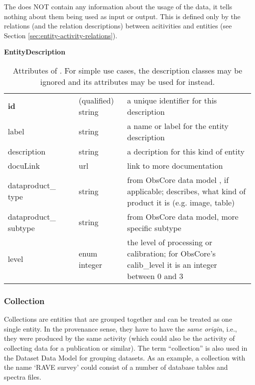 The  does NOT contain any information about the usage 
of the data, it tells nothing about them being used as input or output. This is 
defined only by the relations (and the relation descriptions) between acitivities
and entities (see Section \ref{sec:entity-activity-relations}).


\begin{table}[h]
\small
{}\textwidth
\textbf{\normalsize EntityDescription}\vspace{0.25em}\\
\begin{tabulary}{\textwidth}{@{}p{2.75cm}p{0cm}p{2cm}L@{}}
\toprule
{} & \head{} &  & \\
\midrule
\textbf{id} & & (qualified) string & a unique identifier for this description\\
label       & & string & a name or label for the entity description\\
description & & string & a decription for this kind of entity\\
docuLink    & & url & link to more documentation\\
dataproduct\_ type  & & string       & from ObsCore data model \citep{std:ObsCore}, if applicable; describes, what kind of product it is (e.g. image, table)\\
dataproduct\_ subtype & & string       & from ObsCore data model, more specific subtype\\
level       & & enum integer & the level of processing or calibration; for ObsCore's calib\_level it is an integer between 0 and 3\\
\bottomrule
\end{tabulary}
\caption{Attributes of . For simple use cases, 
the description classes may be ignored and its attributes may be used for 
 instead. 
}\label{tab:entitydescription-attributes}
\end{table}


\subsubsection{Collection}
Collections are entities that are grouped together and can be treated as one single entity. 
In the provenance sense, they have to have the \emph{same origin}, i.e., they were 
produced by the same activity (which could also be the activity of collecting
data for a publication or similar). The term ``collection'' is 
also used in the Dataset Data Model for grouping datasets.
As an example, a collection 
with the name `RAVE survey' could consist of a number of database tables and spectra files.

